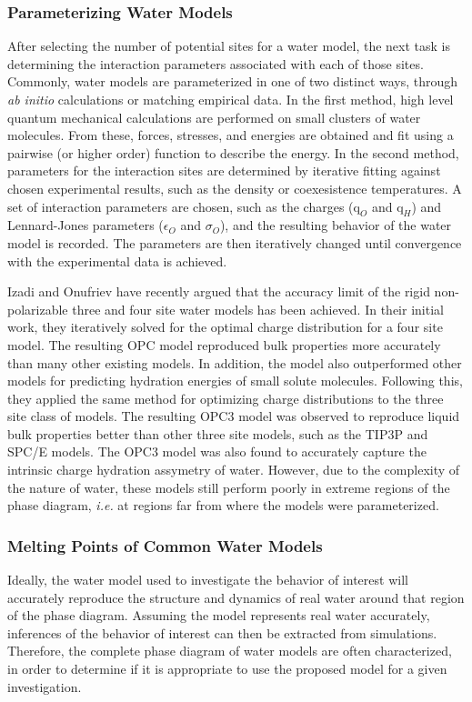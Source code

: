 \subsubsection{Parameterizing Water Models}
After selecting the number of potential sites for a water model, the
next task is determining the interaction parameters associated with
each of those sites. Commonly, water models are parameterized in one
of two distinct ways, through \textit{ab initio} calculations or
matching empirical data. In the first method, high level quantum
mechanical calculations are performed on small clusters of water
molecules. From these, forces, stresses, and energies are obtained and
fit using a pairwise (or higher order) function to describe the
energy. In the second method, parameters for the interaction sites are
determined by iterative fitting against chosen experimental results,
such as the density or coexesistence temperatures. A set of
interaction parameters are chosen, such as the charges ($\mathrm{q}_O$
and $\mathrm{q}_H$) and Lennard-Jones parameters ($\epsilon_O$ and
$\sigma_O$), and the resulting behavior of the water model is
recorded. The parameters are then iteratively changed until
convergence with the experimental data is achieved. 

Izadi and Onufriev have recently argued that the accuracy limit of the
rigid non-polarizable three and four site water models has been
achieved.\cite{Izadi2014,Izadi2016} In their initial work, they
iteratively solved for the optimal charge distribution for a four site
model.\cite{Izadi2014} The resulting OPC model reproduced bulk
properties more accurately than many other existing models. In
addition, the model also outperformed other models for predicting
hydration energies of small solute molecules. Following this, they
applied the same method for optimizing charge distributions to the
three site class of models. The resulting OPC3 model was observed
to reproduce liquid bulk properties better than other three site
models, such as the TIP3P and SPC/E models. The OPC3 model was also
found to accurately capture the intrinsic charge hydration assymetry
of water. However, due to the complexity of the nature of water, these
models still perform poorly in extreme regions of the phase diagram,
\textit{i.e.} at regions far from where the models were parameterized.

\subsubsection{Melting Points of Common Water Models}
Ideally, the water model used to investigate the behavior of interest
will accurately reproduce the structure and dynamics of real water
around that region of the phase diagram. Assuming the model represents
real water accurately, inferences of the behavior of interest can then
be extracted from simulations. Therefore, the complete phase diagram
of water models are often characterized, in order to determine if it
is appropriate to use the proposed model for a given investigation.

